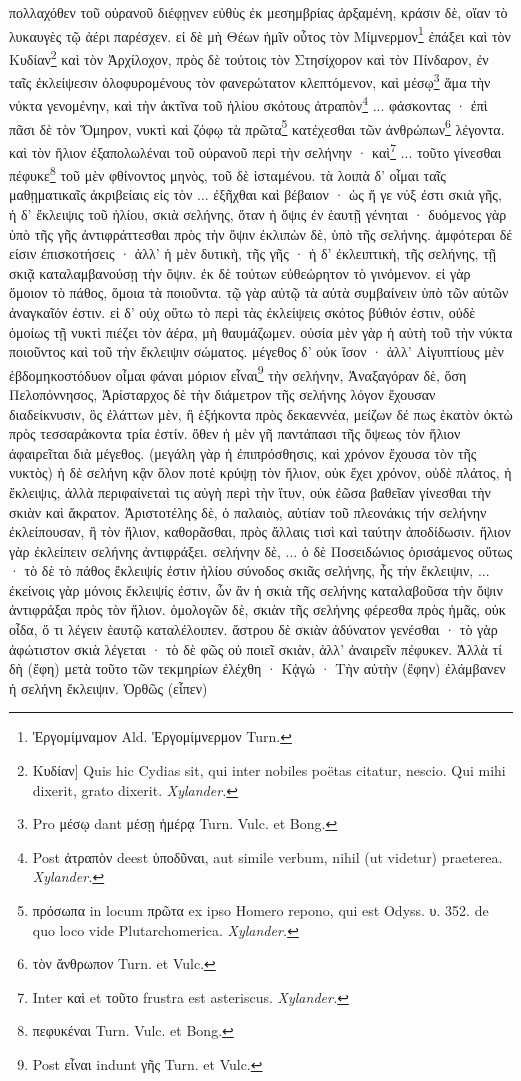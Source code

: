 \documentclass[a4paper, 11pt, oneside, polutonikogreek, german]{article}
\begin{document}
πολλαχόθεν τοῦ οὐρανοῦ διέφῃνεν εὐθὺς ἐκ μεσημβρίας ἀρξαμένη, κράσιν δὲ, οἵαν τὸ λυκαυγὲς τῷ ἀέρι παρέσχεν. εἰ δὲ μὴ Θέων ἡμῖν οὗτος τὸν Μίμνερμον\footnote{Ἐργομίμναμον Ald. Ἐργομίμνερμον Turn.} ἐπάξει καὶ τὸν Κυδίαν\footnote{Κυδίαν] Quis hic Cydias sit, qui inter nobiles poëtas citatur, nescio. Qui mihi dixerit, grato dixerit. \emph{Xylander.}} καὶ τὸν Ἀρχίλοχον, πρὸς δὲ τούτοις τὸν Στησίχορον καὶ τὸν Πίνδαρον, ἐν ταῖς ἐκλείψεσιν ὀλοφυρομένους τὸν φανερώτατον κλεπτόμενον, καὶ μέσῳ\footnote{Pro μέσῳ dant μέσῃ ἡμέρᾳ Turn. Vulc. et Bong.} ἅμα τὴν νύκτα γενομένην, καὶ τὴν ἀκτῖνα τοῦ ἡλίου σκότους ἀτραπὸν\footnote{Post ἀτραπὸν deest ὑποδῦναι, aut simile verbum, nihil (ut videtur) praeterea. \emph{Xylander.}} ... φάσκοντας · ἐπὶ πᾶσι δὲ τὸν Ὅμηρον, νυκτὶ καὶ ζόφῳ τὰ πρῶτα\footnote{πρόσωπα in locum πρῶτα ex ipso Homero repono, qui est Odyss. υ. 352. de quo loco vide Plutarchomerica. \emph{Xylander.}} κατέχεσθαι τῶν ἀνθρώπων\footnote{τὸν ἄνθρωπον Turn. et Vulc.} λέγοντα. καὶ τὸν ἥλιον ἐξαπολωλέναι τοῦ οὐρανοῦ περὶ τὴν σελήνην · καὶ\footnote{Inter καὶ et τοῦτο frustra est asteriscus. \emph{Xylander.}} ... τοῦτο γίνεσθαι πέφυκε\footnote{πεφυκέναι Turn. Vulc. et Bong.} τοῦ μὲν φθίνοντος μηνὸς, τοῦ δὲ ἱσταμένου. τὰ λοιπὰ δ' οἶμαι ταῖς μαθῃματικαῖς ἀκριβείαις εἰς τὸν ... ἐξῆχθαι καὶ βέβαιον · ὡς ἥ γε νύξ ἐστι σκιὰ γῆς, ἡ δ' ἔκλειψις τοῦ ἡλίου, σκιὰ σελήνης, ὅταν ἡ ὄψις ἐν ἑαυτῇ γένηται · δυόμενος γὰρ ὑπὸ τῆς γῆς ἀντιφράττεσθαι πρὸς τὴν ὄψιν ἐκλιπὼν δὲ, ὑπὸ τῆς σελήνης. ἀμφότεραι δέ είσιν ἐπισκοτήσεις · ἀλλ' ἡ μὲν δυτικὴ, τῆς γῆς · ἡ δ' ἐκλειπτικὴ, τῆς σελήνης, τῇ σκιᾷ καταλαμβανούσῃ τὴν ὄψιν. ἐκ δὲ τούτων εὐθεώρητον τὸ γινόμενον. εἰ γὰρ ὅμοιον τὸ πάθος, ὅμοια τὰ ποιοῦντα. τῷ γὰρ αὐτῷ τὰ αὐτὰ συμβαίνειν ὑπὸ τῶν αὐτῶν ἀναγκαῖόν ἐστιν. εἰ δ' οὐχ οὕτω τὸ περὶ τὰς ἐκλείψεις σκότος βύθιόν ἐστιν, οὐδὲ ὁμοίως τῇ νυκτὶ πιέζει τὸν ἀέρα, μὴ θαυμάζωμεν. οὐσία μὲν γὰρ ἡ αὐτὴ τοῦ τὴν νύκτα ποιοῦντος καὶ τοῦ τὴν ἔκλειψιν σώματος. μέγεθος δ' οὐκ ἴσον · ἀλλ' Αἰγυπτίους μὲν ἑβδομηκοστόδυον οἶμαι φάναι μόριον εἶναι\footnote{Post εἶναι indunt γῆς Turn. et Vulc.} τὴν σελήνην, Ἀναξαγόραν δὲ, ὅση Πελοπόννησος, Ἀρίσταρχος δὲ τὴν διάμετρον τῆς σελήνης λόγον ἔχουσαν διαδείκνυσιν, ὃς ἐλάττων μὲν, ἢ ἑξήκοντα πρὸς δεκαεννέα, μείζων δέ πως ἑκατὸν ὀκτὼ πρὸς τεσσαράκοντα τρία ἐστίν. ὅθεν ἡ μὲν γῆ παντάπασι τῆς ὄψεως τὸν ἥλιον ἀφαιρεῖται διὰ μέγεθος. (μεγάλη γὰρ ἡ ἐπιπρόσθησις, καὶ χρόνον ἔχουσα τὸν τῆς νυκτὸς) ἡ δὲ σελήνη κᾂν ὅλον ποτὲ κρύψῃ τὸν ἥλιον, οὐκ ἔχει χρόνον, οὐδὲ πλάτος, ἡ ἔκλειψις, ἀλλὰ περιφαίνεταὶ τις αὐγὴ περὶ τὴν ἴτυν, οὐκ ἐῶσα βαθεῖαν γίνεσθαι τὴν σκιὰν καὶ ἄκρατον. Ἀριστοτέλης δὲ, ὁ παλαιὸς, αὐτίαν τοῦ πλεονάκις τήν σελήνην ἐκλείπουσαν, ἢ τὸν ἥλιον, καθορᾶσθαι, πρὸς ἄλλαις τισὶ καὶ ταύτην ἀποδίδωσιν. ἥλιον γὰρ ἐκλείπειν σελήνης ἀντιφράξει. σελήνην δὲ, ... ὁ δὲ Ποσειδώνιος ὁρισάμενος οὕτως · τὸ δὲ τὸ πάθος ἔκλειψίς ἐστιν ἡλίου σύνοδος σκιᾶς σελήνης, ἧς τὴν ἔκλειψιν, ... ἐκείνοις γὰρ μόνοις ἔκλειψίς ἐστιν, ὧν ἂν ἡ σκιὰ τῆς σελήνης καταλαβοῦσα τὴν ὄψιν ἀντιφράξαι πρὸς τὸν ἥλιον. ὁμολογῶν δὲ, σκιὰν τῆς σελήνης φέρεσθα πρὸς ἡμᾶς, οὐκ οἶδα, ὅ τι λέγειν ἑαυτῷ καταλέλοιπεν. ἄστρου δὲ σκιὰν ἀδύνατον γενέσθαι · τὸ γὰρ ἀφώτιστον σκιὰ λέγεται · τὸ δὲ φῶς οὐ ποιεῖ σκιὰν, ἀλλ' ἀναιρεῖν πέφυκεν. Ἀλλὰ τί δὴ (ἔφη) μετὰ τοῦτο τῶν τεκμηρίων ἐλέχθη · Κᾀγώ · Τὴν αὐτὴν (ἔφην) ἐλάμβανεν ἡ σελήνη ἔκλειψιν. Ὀρθῶς (εἶπεν) 
\end{document}
